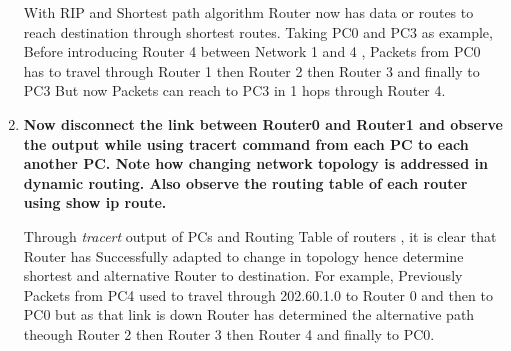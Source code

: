 \documentclass[a4paper,11pt]{article}
\begin{document}
\begin{enumerate}


          With RIP and Shortest path algorithm Router now has data or routes to reach destination through shortest routes. Taking PC0 and PC3 as example, Before introducing Router 4 between Network 1 and 4 , Packets from PC0 has to travel through Router 1 then Router 2 then Router 3 and finally to PC3 But now Packets can reach to PC3 in 1 hops through Router 4.



    \item \textbf{Now disconnect the link between Router0 and Router1 and observe the output while using
              tracert command from each PC to each another PC. Note how changing network topology
              is addressed in dynamic routing. Also observe the routing table of each router using show
              ip route.}








          Through \textit{tracert} output of PCs and Routing Table of routers , it is clear that Router has Successfully adapted to change in topology hence determine shortest and alternative Router to destination. For example, Previously Packets from PC4 used to travel  through 202.60.1.0 to Router 0 and then to PC0 but as that link is down Router has determined the alternative path theough Router 2 then Router 3 then Router 4 and finally to PC0.



\end{enumerate}
\end{document}
